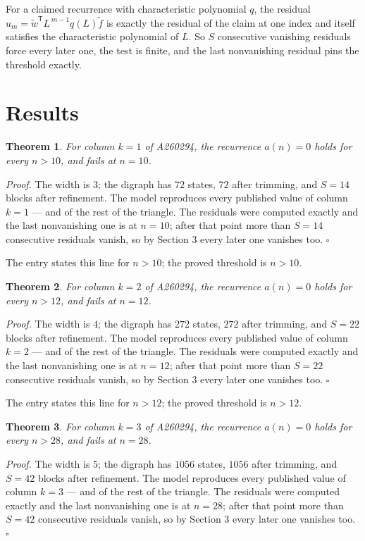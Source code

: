 \documentclass[11pt]{article}
\newtheorem{theorem}{Theorem}
\theoremstyle{definition}
\begin{document}
For a claimed recurrence with characteristic polynomial $q$, the residual $u_m = \tilde w^{\mathsf T}L^{\,m-1}q(L)\tilde f$ is exactly the residual of the claim at one index and itself satisfies the characteristic polynomial of $L$. So $S$ consecutive vanishing residuals force every later one, the test is finite, and the last nonvanishing residual pins the threshold exactly.

\section{Results}

\begin{theorem} For column $k = 1$ of A260294, the recurrence $a(n) = 0$ holds for every $n > 10$, and fails at $n = 10$.\end{theorem}

{\itshape Proof.} The width is $3$; the digraph has $72$ states, $72$ after trimming, and $S = 14$ blocks after refinement. The model reproduces every published value of column $k = 1$ --- and of the rest of the triangle. The residuals were computed exactly and the last nonvanishing one is at $n = 10$; after that point more than $S = 14$ consecutive residuals vanish, so by Section 3 every later one vanishes too. $\square$

The entry states this line for $n > 10$; the proved threshold is $n > 10$.

\begin{theorem} For column $k = 2$ of A260294, the recurrence $a(n) = 0$ holds for every $n > 12$, and fails at $n = 12$.\end{theorem}

{\itshape Proof.} The width is $4$; the digraph has $272$ states, $272$ after trimming, and $S = 22$ blocks after refinement. The model reproduces every published value of column $k = 2$ --- and of the rest of the triangle. The residuals were computed exactly and the last nonvanishing one is at $n = 12$; after that point more than $S = 22$ consecutive residuals vanish, so by Section 3 every later one vanishes too. $\square$

The entry states this line for $n > 12$; the proved threshold is $n > 12$.

\begin{theorem} For column $k = 3$ of A260294, the recurrence $a(n) = 0$ holds for every $n > 28$, and fails at $n = 28$.\end{theorem}

{\itshape Proof.} The width is $5$; the digraph has $1056$ states, $1056$ after trimming, and $S = 42$ blocks after refinement. The model reproduces every published value of column $k = 3$ --- and of the rest of the triangle. The residuals were computed exactly and the last nonvanishing one is at $n = 28$; after that point more than $S = 42$ consecutive residuals vanish, so by Section 3 every later one vanishes too. $\square$
\end{document}
